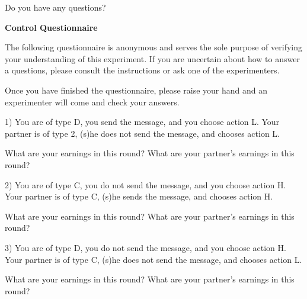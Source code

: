 \documentclass[12pt]{article}
\theoremstyle{break}
\begin{document}
Do you have any questions? 

\textbf{Control Questionnaire}

The following questionnaire is anonymous and serves the sole purpose of verifying your understanding of this experiment. If you are uncertain about how to answer a questions, please consult the instructions or ask one of the experimenters.

Once you have finished the questionnaire, please raise your hand and an experimenter will come and check your answers.

1) You are of type D, you send the message, and you choose action L. Your partner is of type 2, (s)he does not send the message, and chooses action L.

What are your earnings in this round?
What are your partner’s earnings in this round?

2) You are of type C, you do not send the message, and you choose action H. Your partner is of type C, (s)he sends the message, and chooses action H.

What are your earnings in this round?
What are your partner’s earnings in this round?


3) You are of type D, you do not send the message, and you choose action H. Your partner is of type C, (s)he does not send the message, and chooses action L.

What are your earnings in this round?
What are your partner’s earnings in this round?










\end{document}

